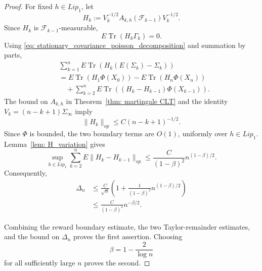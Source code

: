 \documentclass[10pt,a4paper]{article}
\begin{document}
\begin{proof}
For fixed $h\in Lip_1$, let
\[
H_k
:=
V_k^{-1/2}
A_{k,h}(\mathcal F_{k-1})
V_k^{-1/2}.
\]
Since $H_k$ is $\mathcal F_{k-1}$-measurable,
\[
E\operatorname{Tr}(H_k\Gamma_k)=0.
\]
Using
\eqref{eq: stationary_covariance_poisson_decomposition}
and summation by parts,
\begin{align*}
&\sum_{k=1}^n
E\operatorname{Tr}
\left(
H_k(E(\Sigma_k)-\Sigma_k)
\right)
\\
&=
E\operatorname{Tr}(H_1\Phi(X_0))
-
E\operatorname{Tr}(H_n\Phi(X_n))
\\
&\quad+
\sum_{k=2}^n
E\operatorname{Tr}
\left(
(H_k-H_{k-1})\Phi(X_{k-1})
\right).
\end{align*}
The bound on $A_{k,h}$ in
Theorem~\ref{thm: martingale CLT} and the identity
$V_k=(n-k+1)\Sigma_\infty$ imply
\[
\|H_k\|_{op}
\leq
C(n-k+1)^{-1/2}.
\]
Since $\Phi$ is bounded, the two boundary terms are $O(1)$,
uniformly over $h\in Lip_1$. Lemma~\ref{lem: H_variation} gives
\[
\sup_{h\in Lip_1}
\sum_{k=2}^n
E\|H_k-H_{k-1}\|_{op}
\leq
\frac{C}{(1-\beta)^2}n^{(1-\beta)/2}.
\]
Consequently,
\begin{align*}
\Delta_n
&\leq
\frac{C}{\sqrt n}
\left(
1+
\frac{1}{(1-\beta)^2}n^{(1-\beta)/2}
\right)
\\
&\leq
\frac{C}{(1-\beta)^2}n^{-\beta/2}.
\end{align*}

Combining the reward boundary estimate, the two Taylor-remainder
estimates, and the bound on $\Delta_n$ proves the first assertion.
Choosing
\[
\beta=1-\frac{2}{\log n}
\]
for all sufficiently large $n$ proves the second.
\end{proof}



\end{document}
